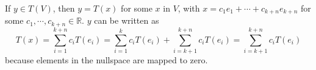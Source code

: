 If $y \in T(V)$, then $y = T(x)$ for some $x$ in $V$, with $x = c_1 e_1 + \cdots + c_{k + n} e_{k + n}$ for some $c_1, \cdots, c_{k + n} \in \mathbb{R}$. $y$ can be written as
		\[ T(x) = \sum_{i = 1}^{k + n} c_i T(e_i) = \sum_{i = 1}^{k} c_i T(e_i) + \sum_{i = k + 1}^{k + n} c_i T(e_i) = \sum_{i = k + 1}^{k + n} c_i T(e_i) \]
		because elements in the nullspace are mapped to zero.